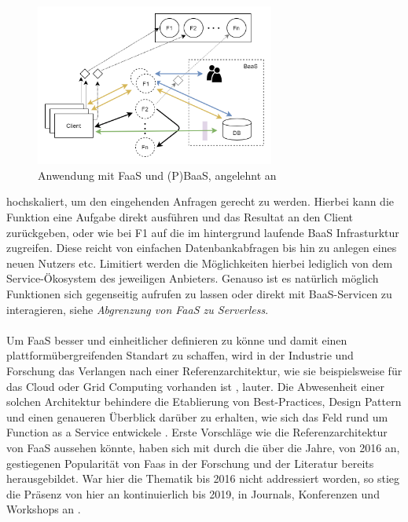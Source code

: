 \documentclass[11pt]{article}
\begin{document}
\begin{figure}[H]
\caption{Anwendung mit FaaS und (P)BaaS, angelehnt an \cite{shafiei2020serverless}}
\label{fig:FaaSBaaSExample}
\centering
\includegraphics[width=0.7\textwidth]{FaaS}
\end{figure}
hochskaliert, um den eingehenden Anfragen gerecht zu werden. Hierbei kann die Funktion eine Aufgabe direkt ausführen und das Resultat an den Client zurückgeben, oder wie bei F1 auf die im hintergrund laufende BaaS Infrasturktur zugreifen. Diese reicht von einfachen Datenbankabfragen bis hin zu anlegen eines neuen Nutzers etc. Limitiert werden die Möglichkeiten hierbei lediglich von dem Service-Ökosystem des jeweiligen Anbieters. Genauso ist es natürlich möglich Funktionen sich gegenseitig aufrufen zu lassen oder direkt mit BaaS-Servicen zu interagieren, siehe \textit{Abgrenzung von FaaS zu Serverless}.\\\\
Um FaaS besser und einheitlicher definieren zu könne und damit einen plattformübergreifenden Standart zu schaffen, wird in der Industrie und Forschung das Verlangen nach einer Referenzarchitektur, wie sie beispielsweise für das Cloud oder Grid Computing vorhanden ist \cite{liu2011nist}, \cite{foster2003grid} lauter. Die Abwesenheit einer solchen Architektur behindere die Etablierung von Best-Practices, Design Pattern und einen genaueren Überblick darüber zu erhalten, wie sich das Feld rund um Function as a Service entwickele \cite{leitner2019mixed}. Erste Vorschläge wie die Referenzarchitektur von FaaS aussehen könnte, haben sich mit \cite{van2019spec} durch die über die Jahre, von 2016 an, gestiegenen Popularität von Faas in der Forschung und der Literatur bereits herausgebildet. War hier die Thematik bis 2016 nicht addressiert worden, so stieg die Präsenz von hier an kontinuierlich bis 2019, in Journals, Konferenzen und Workshops an \cite{Yussupov2019_SystematicMappingStudyFaaS}.\\\\
\end{document}
